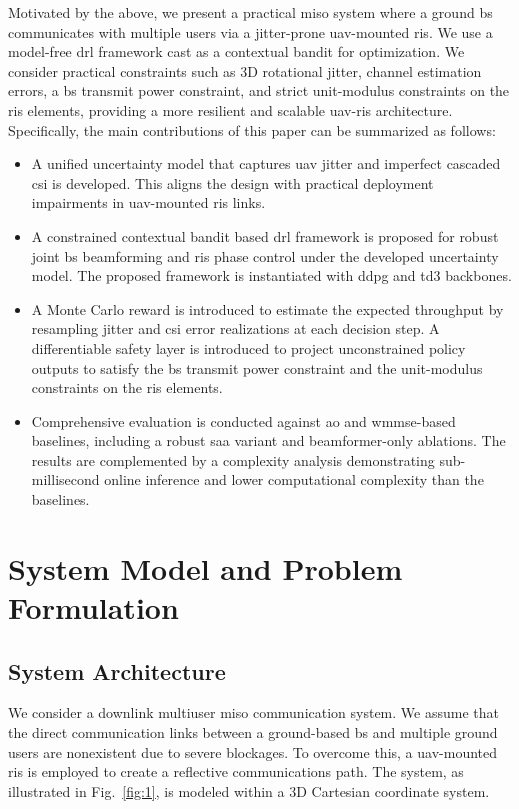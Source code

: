 \documentclass[letterpaper,journal]{IEEEtran}
\begin{document}
Motivated by the above, we present a practical \gls{miso} system where a ground \gls{bs} communicates with multiple users via a jitter-prone \gls{uav}-mounted \gls{ris}. We use a model-free \gls{drl} framework cast as a contextual bandit for optimization. We consider practical constraints such as 3D rotational jitter, channel estimation errors, a \gls{bs} transmit power constraint, and strict unit-modulus constraints on the \gls{ris} elements, providing a more resilient and scalable \gls{uav}-\gls{ris} architecture.
Specifically, the main contributions of this paper can be summarized as follows:
\begin{itemize}
\item A unified uncertainty model that captures \gls{uav} jitter and imperfect cascaded \gls{csi} is developed. This aligns the design with practical deployment impairments in \gls{uav}-mounted \gls{ris} links.
\item A constrained contextual bandit based \gls{drl} framework is proposed for robust joint \gls{bs} beamforming and \gls{ris} phase control under the developed uncertainty model. The proposed framework is instantiated with \gls{ddpg} and \gls{td3} backbones.
\item A Monte Carlo reward is introduced to estimate the expected throughput by resampling jitter and \gls{csi} error realizations at each decision step. A differentiable safety layer is introduced to project unconstrained policy outputs to satisfy the \gls{bs} transmit power constraint and the unit-modulus constraints on the \gls{ris} elements.
\item Comprehensive evaluation is conducted against \gls{ao} and \gls{wmmse}-based baselines, including a robust \gls{saa} variant and beamformer-only ablations. The results are complemented by a complexity analysis demonstrating sub-millisecond online inference and lower computational complexity than the baselines.
\end{itemize}
\section{System Model and Problem Formulation}
\label{sec:system_model}
\subsection{System Architecture}
We consider a downlink multiuser \gls{miso} communication system. We assume that the direct communication links between a ground-based \gls{bs} and multiple ground users are nonexistent due to severe blockages. To overcome this, a \gls{uav}-mounted \gls{ris} is employed to create a reflective communications path. The system, as illustrated in Fig.~\ref{fig:1}, is modeled within a 3D Cartesian coordinate system.
\end{document}
